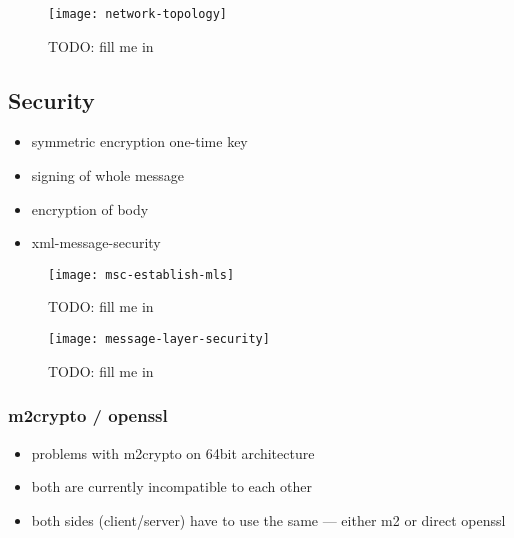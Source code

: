 \begin{figure}[ht]
  \centering
  \texttt{[image: network-topology]}
  \caption[Network  Topology]{TODO: fill me in}
  \label{fig:net-top}
\end{figure}

\subsection{Security}
\label{sec:security}

\begin{itemize}
\item symmetric encryption one-time key
\item signing of whole message
\item encryption of body
\item xml-message-security
\end{itemize}

\begin{figure}[ht]
  \centering
  \texttt{[image: msc-establish-mls]}
  \caption[MSC Message Layer Security]{TODO: fill me in}
  \label{fig:msc-establish-mls}
\end{figure}


\begin{figure}[ht]
  \centering
  \texttt{[image: message-layer-security]}
  \caption[Message Layer Security]{TODO: fill me in}
  \label{fig:net-mls}
\end{figure}

\subsubsection{m2crypto / openssl}

\begin{itemize}
\item problems with m2crypto on 64bit architecture
\item both are currently incompatible to each other
\item both sides (client/server) have to use the same --- either m2 or
  direct openssl
\end{itemize}

